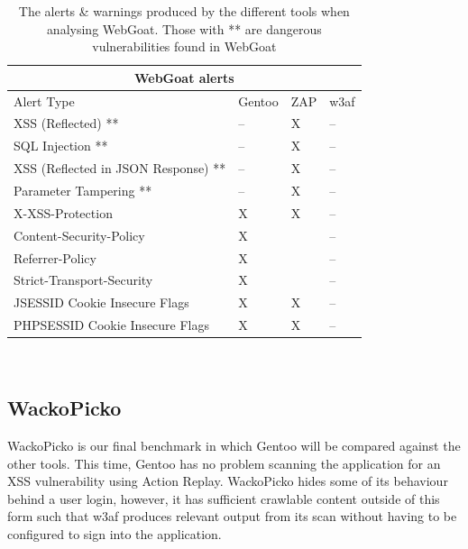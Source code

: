 \begin{table}[h]
	
	{
		
		\captionsetup{justification=centering}
		
		\caption{The alerts \& warnings produced by the different tools when analysing WebGoat. Those with ** are dangerous vulnerabilities found in WebGoat}
		\label{table:webgoat_alerts}
		\begin{tabular}{ |p{7cm}|>{\centering\arraybackslash}m{2cm} |>{\centering\arraybackslash}m{2cm} |>{\centering\arraybackslash}m{2cm}| }
			\hline
			\multicolumn{4}{|c|}{\textbf{WebGoat alerts}} \\ [0.5ex]
			\hline \hline 
			Alert Type & Gentoo & ZAP & w3af \\
			\hline
			XSS (Reflected) ** & -- & X & --\\	
			SQL Injection **& -- & X & --\\
			XSS (Reflected in JSON Response) ** & -- & X & -- \\
			Parameter Tampering **& -- & X & --\\
			X-XSS-Protection & X & X & --\\
			Content-Security-Policy & X & &-- \\
			Referrer-Policy & X & & --\\
			Strict-Transport-Security & X  & & --\\
			JSESSID Cookie Insecure Flags & X & X & -- \\
			PHPSESSID Cookie Insecure Flags & X & X & -- \\
			\hline
		\end{tabular}
	} \\
\end{table}


\subsection{WackoPicko}

WackoPicko is our final benchmark in which Gentoo will be compared against the other tools. This time, Gentoo has no problem scanning the application for an XSS vulnerability using Action Replay. WackoPicko hides some of its behaviour behind a user login, however, it has sufficient crawlable content outside of this form such that w3af produces relevant output from its scan without having to be configured to sign into the application. \\

